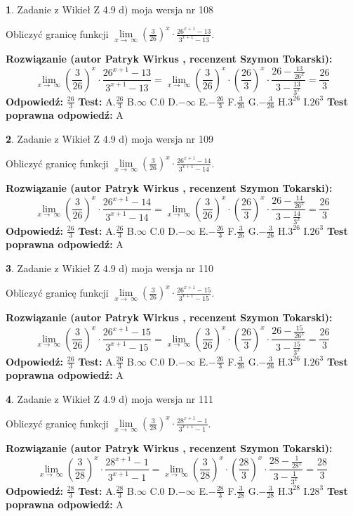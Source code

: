 \documentclass[12pt, a4paper]{article}
\theoremstyle{definition} %
\newtheorem{zad}{}
\newcommand{\zadStart}[1]{\begin{zad}#1\newline}
\newcommand{\zadStop}{\end{zad}}
\newcommand{\rozwStart}[2]{\noindent \textbf{Rozwiązanie (autor #1 , recenzent #2): }\newline}
\newcommand{\rozwStop}{\newline}
\newcommand{\odpStart}{\noindent \textbf{Odpowiedź:}\newline}
\newcommand{\odpStop}{\newline}
\newcommand{\testStart}{\noindent \textbf{Test:}\newline}
\newcommand{\testStop}{\newline}
\newcommand{\kluczStart}{\noindent \textbf{Test poprawna odpowiedź:}\newline}
\newcommand{\kluczStop}{\newline}
\begin{document}
\zadStart{Zadanie z Wikieł Z 4.9 d) moja wersja nr 108}


Obliczyć granicę funkcji  $\lim\limits_{x\to\ \infty}(\frac{3}{26})^{x}\cdot\frac{26^{x+1}-13}{3^{x+1}-13}$.
\zadStop
\rozwStart{Patryk Wirkus}{Szymon Tokarski}
$$\lim\limits_{x\to\ \infty}(\frac{3}{26})^{x}\cdot\frac{26^{x+1}-13}{3^{x+1}-13}=\lim\limits_{x\to\ \infty}(\frac{3}{26})^{x}\cdot(\frac{26}{3})^{x} \cdot \frac{26-\frac{13}{26^{x}}}{3-\frac{13}{3^{x}}} = \frac{26}{3}$$
\rozwStop
\odpStart
$\frac{26}{3}$
\odpStop
\testStart
A.$\frac{26}{3}$ B.$\infty$ C.$0$ D.$-\infty$ E.$-\frac{26}{3}$
F.$\frac{3}{26}$ G.$-\frac{3}{26}$
H.$3^{26}$
I.$26^{3}$
\testStop
\kluczStart
A
\kluczStop



\zadStart{Zadanie z Wikieł Z 4.9 d) moja wersja nr 109}


Obliczyć granicę funkcji  $\lim\limits_{x\to\ \infty}(\frac{3}{26})^{x}\cdot\frac{26^{x+1}-14}{3^{x+1}-14}$.
\zadStop
\rozwStart{Patryk Wirkus}{Szymon Tokarski}
$$\lim\limits_{x\to\ \infty}(\frac{3}{26})^{x}\cdot\frac{26^{x+1}-14}{3^{x+1}-14}=\lim\limits_{x\to\ \infty}(\frac{3}{26})^{x}\cdot(\frac{26}{3})^{x} \cdot \frac{26-\frac{14}{26^{x}}}{3-\frac{14}{3^{x}}} = \frac{26}{3}$$
\rozwStop
\odpStart
$\frac{26}{3}$
\odpStop
\testStart
A.$\frac{26}{3}$ B.$\infty$ C.$0$ D.$-\infty$ E.$-\frac{26}{3}$
F.$\frac{3}{26}$ G.$-\frac{3}{26}$
H.$3^{26}$
I.$26^{3}$
\testStop
\kluczStart
A
\kluczStop



\zadStart{Zadanie z Wikieł Z 4.9 d) moja wersja nr 110}


Obliczyć granicę funkcji  $\lim\limits_{x\to\ \infty}(\frac{3}{26})^{x}\cdot\frac{26^{x+1}-15}{3^{x+1}-15}$.
\zadStop
\rozwStart{Patryk Wirkus}{Szymon Tokarski}
$$\lim\limits_{x\to\ \infty}(\frac{3}{26})^{x}\cdot\frac{26^{x+1}-15}{3^{x+1}-15}=\lim\limits_{x\to\ \infty}(\frac{3}{26})^{x}\cdot(\frac{26}{3})^{x} \cdot \frac{26-\frac{15}{26^{x}}}{3-\frac{15}{3^{x}}} = \frac{26}{3}$$
\rozwStop
\odpStart
$\frac{26}{3}$
\odpStop
\testStart
A.$\frac{26}{3}$ B.$\infty$ C.$0$ D.$-\infty$ E.$-\frac{26}{3}$
F.$\frac{3}{26}$ G.$-\frac{3}{26}$
H.$3^{26}$
I.$26^{3}$
\testStop
\kluczStart
A
\kluczStop



\zadStart{Zadanie z Wikieł Z 4.9 d) moja wersja nr 111}


Obliczyć granicę funkcji  $\lim\limits_{x\to\ \infty}(\frac{3}{28})^{x}\cdot\frac{28^{x+1}-1}{3^{x+1}-1}$.
\zadStop
\rozwStart{Patryk Wirkus}{Szymon Tokarski}
$$\lim\limits_{x\to\ \infty}(\frac{3}{28})^{x}\cdot\frac{28^{x+1}-1}{3^{x+1}-1}=\lim\limits_{x\to\ \infty}(\frac{3}{28})^{x}\cdot(\frac{28}{3})^{x} \cdot \frac{28-\frac{1}{28^{x}}}{3-\frac{1}{3^{x}}} = \frac{28}{3}$$
\rozwStop
\odpStart
$\frac{28}{3}$
\odpStop
\testStart
A.$\frac{28}{3}$ B.$\infty$ C.$0$ D.$-\infty$ E.$-\frac{28}{3}$
F.$\frac{3}{28}$ G.$-\frac{3}{28}$
H.$3^{28}$
I.$28^{3}$
\testStop
\kluczStart
A
\kluczStop
\end{document}
